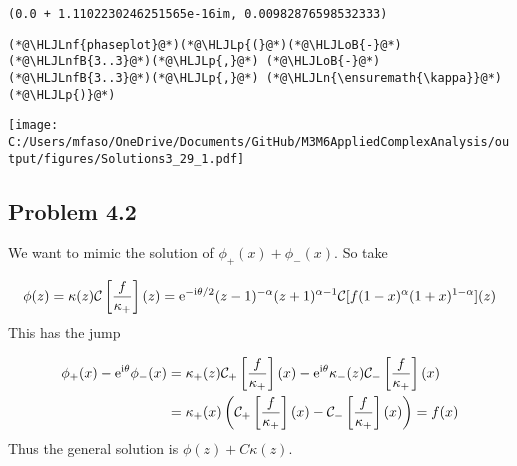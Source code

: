 \documentclass[12pt,a4paper]{article}
\newcommand{\HLJLn}[1]{#1}
\newcommand{\HLJLnf}[1]{\textcolor[RGB]{66,102,213}{#1}}
\newcommand{\HLJLnfB}[1]{\textcolor[RGB]{59,151,46}{#1}}
\newcommand{\HLJLoB}[1]{\textcolor[RGB]{102,102,102}{\textbf{#1}}}
\newcommand{\HLJLp}[1]{#1}
\def\I{ {\rm i} }
\def\E{ {\rm e} }
\def\CC{ {\cal C} }
\def\pr(#1){\left({#1}\right)}
\def\br[#1]{\left[{#1}\right]}
\begin{document}
\begin{lstlisting}
(0.0 + 1.1102230246251565e-16im, 0.00982876598532333)
\end{lstlisting}


\begin{lstlisting}
(*@\HLJLnf{phaseplot}@*)(*@\HLJLp{(}@*)(*@\HLJLoB{-}@*)(*@\HLJLnfB{3..3}@*)(*@\HLJLp{,}@*) (*@\HLJLoB{-}@*)(*@\HLJLnfB{3..3}@*)(*@\HLJLp{,}@*) (*@\HLJLn{\ensuremath{\kappa}}@*)(*@\HLJLp{)}@*)
\end{lstlisting}

\texttt{[image: C:/Users/mfaso/OneDrive/Documents/GitHub/M3M6AppliedComplexAnalysis/output/figures/Solutions3\_29\_1.pdf]}

\subsection{Problem 4.2}
We want to mimic the solution of $\phi_+(x) + \phi_-(x)$. So take

\[
\phi(z) = \kappa(z) \CC\br[{f \over \kappa_+}](z) =\E^{-\I \theta/2} (z-1)^{-\alpha}(z+1)^{\alpha-1} \CC[f (1-x)^{\alpha}(1+x)^{1-\alpha}](z)
\]
This has the jump


\begin{align*}
\phi_+(x) - \E^{\I \theta}\phi_-(x)  &= \kappa_+(z) \CC_+\br[{f \over \kappa_+}](x) -  \E^{\I \theta}\kappa_-(z)\CC_-\br[{f \over \kappa_+}](x)  \\
&= \kappa_+(x)  \pr({\CC_+\br[{f \over \kappa_+}](x) - \CC_-\br[{f \over \kappa_+}](x)  }) = f(x)
\end{align*}
Thus the general solution is $\phi(z) + C \kappa(z)$.
\end{document}
